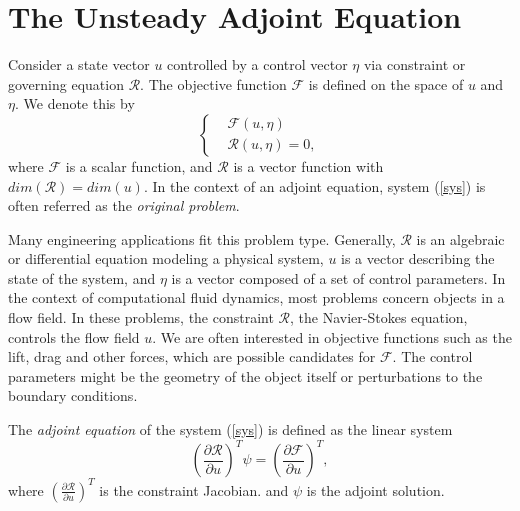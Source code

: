 \documentclass[a4paper,11pt]{article}
\theoremstyle{remark}
\theoremstyle{definition}
\begin{document}
\section{The Unsteady Adjoint Equation}
    Consider a state vector $u$ controlled by a control vector $\eta$
    via constraint or governing equation $\mathcal{R}$.  The objective function
    $\mathcal{F}$ is defined on the space of $u$ and $\eta$.  We denote this by
    \begin{equation} \label{sys} \left\{ \begin{aligned}
        & \mathcal{F}(u,\eta) \\
        & \mathcal{R}(u,\eta) = 0 ,
    \end{aligned} \right. \end{equation}
    where $\mathcal{F}$ is a scalar function, and $\mathcal{R}$ is a
    vector function with $dim(\mathcal{R}) = dim(u)$.  In the context of
    an adjoint equation, system (\ref{sys}) is often referred as the
    \emph{original problem}.
    
    Many engineering applications fit this problem type.  Generally,
    $\mathcal{R}$ is an algebraic or differential equation modeling a
    physical system, $u$ is a vector describing the state of the system,
    and $\eta$ is a vector composed of a set of control parameters.  In
    the context of computational fluid dynamics, most problems concern
    objects in a flow field.  In these problems, the constraint
    $\mathcal{R}$, the Navier-Stokes equation, controls the flow field
    $u$.  We are often interested in objective functions such as
    the lift, drag and other forces, which are possible candidates for
    $\mathcal{F}$.  The control parameters might be the geometry of the
    object itself or perturbations to the boundary conditions.
    
    The \emph{adjoint equation} of the system (\ref{sys}) is defined as the
    linear system
    \begin{equation} \label{adj}
          \left( \frac{\partial\mathcal{R}}{\partial u} \right)^T \psi
        = \left( \frac{\partial\mathcal{F}}{\partial u} \right)^T ,
    \end{equation}
    where $\left( \frac{\partial\mathcal{R}}{\partial u} \right)^T$ is the
    constraint Jacobian.  and $\psi$ is the adjoint solution.
    
\end{document}
